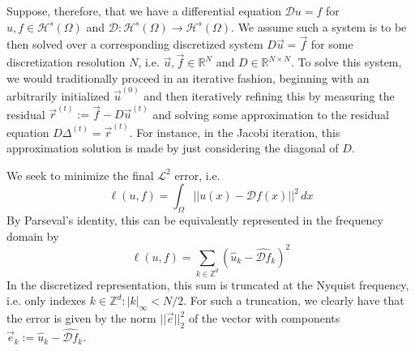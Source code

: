 \documentclass[12pt]{article}
\begin{document}
Suppose, therefore, that we have a differential equation $\mathcal{D} u = f$ for $u, f\in\mathcal{H}^{s}(\Omega)$ and $\mathcal{D} : \mathcal{H}^{s}(\Omega)\to\mathcal{H}^{s}(\Omega)$.  We assume such a system is to be then solved over a corresponding discretized system $D \vec{u} = \vec{f}$ for some discretization resolution $N$, i.e. $\vec{u},\vec{f}\in\mathbb{R}^{N}$ and $D\in\mathbb{R}^{N\times N}$. To solve this system, we would traditionally proceed in an iterative fashion, beginning with an arbitrarily initialized $\vec{u}^{(0)}$ and then iteratively refining this by measuring the residual $\vec{r}^{(t)} := \vec{f} - D \vec{u}^{(t)}$ and solving some approximation to the residual equation $D \Delta^{(t)} = \vec{r}^{(t)}$. For instance, in the Jacobi iteration, this approximation solution is made by just considering the diagonal of $D$. 

We seek to minimize the final $\mathcal{L}^2$ error, i.e.
\begin{equation}
    \ell(u, f) = \int_{\Omega} || u(x) - \mathcal{D}f(x) ||^2\, dx
\end{equation}
By Parseval's identity, this can be equivalently represented in the frequency domain by
\begin{equation}
    \ell(u, f) = \sum_{k\in\mathbb{Z}^{d}} (\widehat{u}_k - \widehat{\mathcal{D}f}_k)^2
\end{equation}
In the discretized representation, this sum is truncated at the Nyquist frequency, i.e. only indexes $k\in\mathbb{Z}^{d} : |k|_{\infty} < N / 2$. For such a truncation, we clearly have that the error is given by the norm $|| \vec{e} ||_2^2$ of the vector with components $\vec{e}_k := \widehat{u}_k - \widehat{\mathcal{D}f}_k$.
\end{document}
